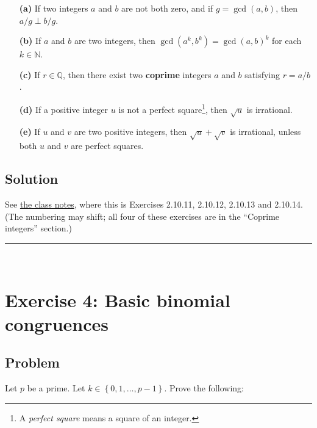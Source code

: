 \documentclass[paper=a4, fontsize=12pt]{scrartcl} %
\newcommand{\QQ}{\mathbb{Q}} %
\newcommand{\NN}{\mathbb{N}} %
\newcommand{\set}[1]{\left\{ #1 \right\}}
\newcommand{\tup}[1]{\left( #1 \right)}
\newcommand{\horrule}[1]{\rule{\linewidth}{#1}} %
\theoremstyle{plainsl}
\theoremstyle{definition}
\theoremstyle{remark}
\begin{document}
\begin{enumerate}

\item[\textbf{(a)}]
If two integers $a$ and $b$ are not both zero, and
if $g = \gcd\tup{a, b}$, then $a/g \perp b/g$.

\item[\textbf{(b)}]
If $a$ and $b$ are two integers, then
$\gcd\tup{a^k, b^k} = \gcd\tup{a, b}^k$ for each
$k \in \NN$.

\item[\textbf{(c)}]
If $r \in \QQ$, then there exist two \textbf{coprime}
integers $a$ and $b$ satisfying $r = a/b$.

\item[\textbf{(d)}]
If a positive integer $u$ is not a perfect
square\footnote{A \textit{perfect square} means a square
of an integer.},
then $\sqrt{u}$ is irrational.

\item[\textbf{(e)}]
If $u$ and $v$ are two positive integers,
then $\sqrt{u} + \sqrt{v}$ is irrational,
unless both $u$ and $v$ are perfect squares.

\end{enumerate}

\subsection{Solution}

See
\href{http://www-users.math.umn.edu/~dgrinber/19s/notes.pdf}{the class notes},
where this is Exercises 2.10.11, 2.10.12, 2.10.13 and 2.10.14.
(The numbering may shift; all four of these exercises are in the
``Coprime integers''
section.)

\horrule{0.3pt} \\[0.4cm]

\section{Exercise 4: Basic binomial congruences}

\subsection{Problem}

Let $p$ be a prime.
Let $k \in \set{0, 1, \ldots, p-1}$.
Prove the following:
\end{document}
